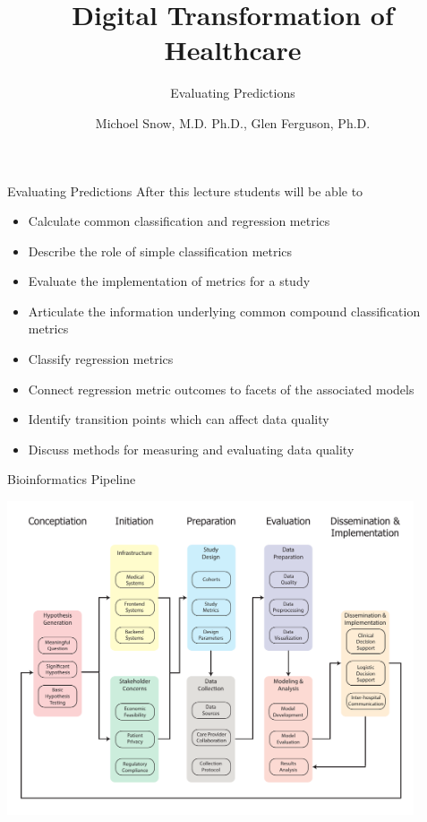 \documentclass[10pt, xcolor=table]{beamer}
\title{Digital Transformation of Healthcare}
\subtitle{Evaluating Predictions}
\date{}
\author{Michoel Snow, M.D. Ph.D., Glen Ferguson, Ph.D.}
\institute{Center for Health Data Innovations}
\begin{document}
\maketitle


\begin{frame}{Evaluating Predictions}
	After this lecture students will be able to 
	\begin{itemize}
		\item Calculate common classification and regression metrics
		\item Describe the role of simple classification metrics
		\item Evaluate the implementation of metrics for a study 
		\item Articulate the information underlying common compound classification metrics 
		\item Classify regression metrics 
		\item Connect regression metric outcomes to facets of the associated models
		\item Identify transition points which can affect data quality
		\item Discuss methods for measuring and evaluating data quality 
	\end{itemize}
\end{frame}




\begin{frame}{Bioinformatics Pipeline}
	\begin{center}
		\includegraphics[width=0.9\textwidth]{images/informatics_pipeline.pdf}	
	\end{center}
\end{frame}
\end{document}
